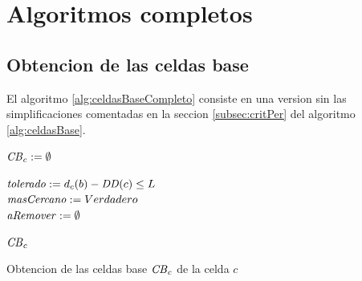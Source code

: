 \chapter{Algoritmos completos}

\section{Obtencion de las celdas base}\label{algComp:celdasbase}
El algoritmo \ref{alg:celdasBaseCompleto} consiste en una version sin las
simplificaciones comentadas en la seccion \ref{subsec:critPer} del algoritmo
\ref{alg:celdasBase}.

\begin{algorithm}[H]
\SetAlgoLined

  $\mathit{CB}_c := \emptyset$

   {
     {
      $\mathit{tolerado}  := d_c(b) - \mathit{DD}(c) \leq L$\\

      $\mathit{masCercano} := Verdadero$\\
      $\mathit{aRemover} := \emptyset$\\
       {
      }
      
    }
  }
  \Return $\mathit{CB}_c$ 

  \caption{Obtencion de las celdas base $\mathit{CB}_c$ de la celda $c$}
  \label{alg:celdasBaseCompleto}
\end{algorithm}

